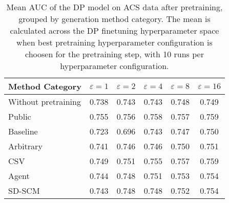 \begin{table}[h!]
    \centering
    \caption{Mean AUC of the DP model on ACS data after pretraining, grouped by generation method category. The mean is calculated across the DP finetuning hyperparameter space when best pretraining hyperparameter configuration is choosen for the pretraining step, with 10 runs per hyperparameter configuration.}
    \label{tab:epsilon_comparison}
    \begin{tabular}{lccccc}
    \toprule
    Method Category & $\varepsilon=1$ & $\varepsilon=2$ & $\varepsilon=4$ & $\varepsilon=8$ & $\varepsilon=16$ \\
    \midrule
    Without pretraining & 0.738 & 0.743 & 0.743 & 0.748 & 0.749 \\
    \arrayrulecolor{black!50!}\midrule
    Public & \cellcolor{gold!30}0.755 & \cellcolor{gold!30}0.756 & \cellcolor{gold!30}0.758 & \cellcolor{gold!30}0.757 & \cellcolor{gold!30}0.759 \\
    \arrayrulecolor{black!50!}\midrule
    Baseline & 0.723 & 0.696 & 0.743 & 0.747 & 0.750 \\
    \arrayrulecolor{black!50!}\midrule
    Arbitrary & 0.741 & 0.746 & 0.746 & 0.750 & \cellcolor{bronze!30}0.751 \\
    \arrayrulecolor{black!50!}\midrule
    CSV & \cellcolor{silver!30}0.749 & \cellcolor{silver!30}0.751 & \cellcolor{silver!30}0.755 & \cellcolor{gold!30}0.757 & \cellcolor{gold!30}0.759 \\
    Agent & \cellcolor{bronze!30}0.744 & \cellcolor{bronze!30}0.748 & \cellcolor{bronze!30}0.751 & \cellcolor{silver!30}0.753 & \cellcolor{silver!30}0.754 \\
    SD-SCM & 0.743 & \cellcolor{bronze!30}0.748 & 0.748 & \cellcolor{bronze!30}0.752 & \cellcolor{silver!30}0.754 \\
    \bottomrule
    \end{tabular}
\end{table}